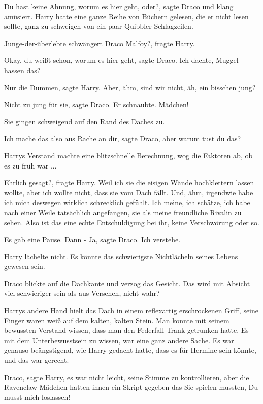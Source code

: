 \glqq{}Du hast keine Ahnung, worum es hier geht, oder?\grqq{}, sagte Draco und
klang amüsiert. Harry hatte eine ganze Reihe von Büchern gelesen, die er nicht
lesen sollte, ganz zu schweigen von ein paar Quibbler-Schlagzeilen.

\glqq{}Junge-der-überlebte schwängert Draco Malfoy?\grqq{}, fragte Harry.

\glqq{}Okay, du weißt schon, worum es hier geht\grqq{}, sagte Draco. \glqq{}Ich
dachte, Muggel hassen das?\grqq{}

\glqq{}Nur die Dummen\grqq{}, sagte Harry. \glqq{}Aber, ähm, sind wir nicht, äh,
ein bisschen jung?\grqq{}

\glqq{}Nicht zu jung für sie\grqq{}, sagte Draco. Er schnaubte. \glqq{}Mädchen!\grqq{}

Sie gingen schweigend auf den Rand des Daches zu.

\glqq{}Ich mache das also aus Rache an dir\grqq{}, sagte Draco, \glqq{}aber warum
tust du das?\grqq{}

Harrys Verstand machte eine blitzschnelle Berechnung, wog die Faktoren ab, ob es
zu früh war ...

\glqq{}Ehrlich gesagt?\grqq{}, fragte Harry. \glqq{}Weil ich sie die eisigen Wände
hochklettern lassen wollte, aber ich wollte nicht, dass sie vom Dach fällt. Und,
ähm, irgendwie habe ich mich deswegen wirklich schrecklich gefühlt. Ich meine,
ich schätze, ich habe nach einer Weile tatsächlich angefangen, sie als meine
freundliche Rivalin zu sehen. Also ist das eine echte Entschuldigung bei ihr,
keine Verschwörung oder so.\grqq{}

Es gab eine Pause. Dann - \glqq{}Ja\grqq{}, sagte Draco. \glqq{}Ich verstehe.\grqq{}

Harry lächelte nicht. Es könnte das schwierigste Nichtlächeln seines Lebens
gewesen sein.

Draco blickte auf die Dachkante und verzog das Gesicht. \glqq{}Das wird mit
Absicht viel schwieriger sein als aus Versehen, nicht wahr?\grqq{}

Harrys andere Hand hielt das Dach in einem reflexartig erschrockenen Griff,
seine Finger waren weiß auf dem kalten, kalten Stein. Man konnte mit seinem
bewussten Verstand wissen, dass man den Federfall-Trank getrunken hatte. Es mit
dem Unterbewusstsein zu wissen, war eine ganz andere Sache. Es war genauso
beängstigend, wie Harry gedacht hatte, dass es für Hermine sein könnte, und das
war gerecht.

\glqq{}Draco\grqq{}, sagte Harry, es war nicht leicht, seine Stimme zu
kontrollieren, aber die Ravenclaw-Mädchen hatten ihnen ein Skript gegeben das
Sie spielen mussten, \glqq{}Du musst mich loslassen!\grqq{}

